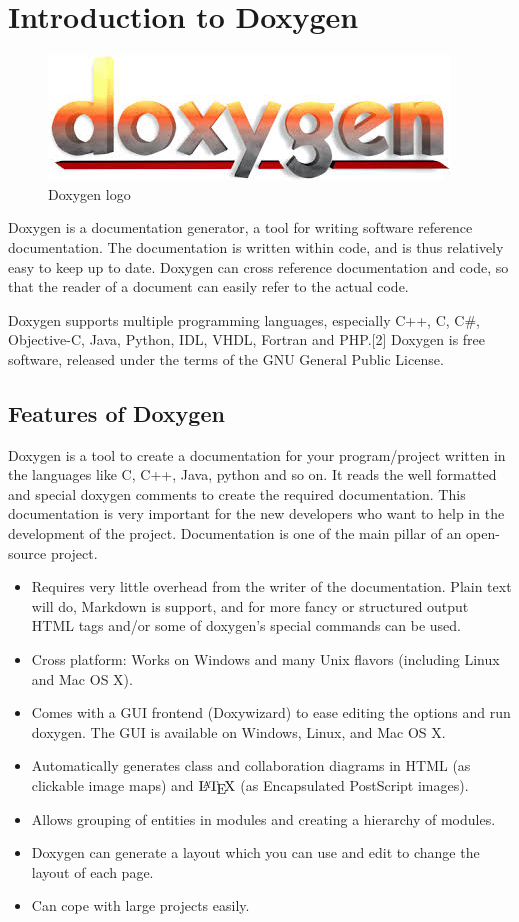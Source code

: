 \section{Introduction to Doxygen}
\begin{figure}[ht]
\centering \includegraphics[scale=1]{input/images/doxygen.jpeg}
\caption{Doxygen logo}
\end{figure}
\noindent Doxygen is a documentation generator, a tool for writing software reference 
documentation. The documentation is written within code, and is thus 
relatively easy to keep up to date. Doxygen can cross reference 
documentation and code, so that the reader of a document can easily 
refer to the actual code.

Doxygen supports multiple programming languages, especially C++, C, 
C\#, Objective-C, Java, Python, IDL, VHDL, Fortran and PHP.[2] Doxygen
 is free software, released under the terms of the GNU General Public 
License.\\

\subsection{Features of Doxygen}
Doxygen is a tool to create a documentation for your program/project written in the languages like C, C++, Java, python and so on. It reads the well formatted and special doxygen comments to create the required documentation. This documentation is very important for the new developers who want to help in the development of the project. Documentation is one of the main pillar of an open-source project.
\begin{itemize}
\item Requires very little overhead from the writer of the documentation. 
Plain text will do, Markdown is support, and for more fancy or structured 
output HTML tags and/or some of doxygen's special commands can be used.
\item Cross platform: Works on Windows and many Unix flavors (including 
Linux and Mac OS X).
\item Comes with a GUI frontend (Doxywizard) to ease editing the options 
and run doxygen. The GUI is available on Windows, Linux, and Mac OS X.
\item Automatically generates class and collaboration diagrams in HTML 
(as clickable image maps) and $\mbox{\LaTeX}$ (as Encapsulated PostScript 
images).
\item Allows grouping of entities in modules and creating a hierarchy 
of modules.
\item Doxygen can generate a layout which you can use and edit to change 
the layout of each page.
\item Can cope with large projects easily.
\end{itemize}
